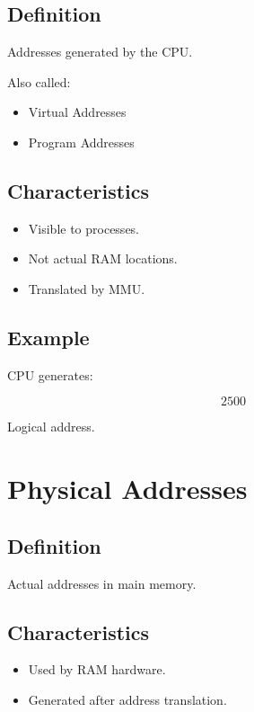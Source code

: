 \subsection{Definition}

Addresses generated by the CPU.

Also called:

\begin{itemize}
\item Virtual Addresses
\item Program Addresses
\end{itemize}

\subsection{Characteristics}

\begin{itemize}
\item Visible to processes.
\item Not actual RAM locations.
\item Translated by MMU.
\end{itemize}

\subsection{Example}

CPU generates:

\[
2500
\]

Logical address.

\section{Physical Addresses}

\subsection{Definition}

Actual addresses in main memory.

\subsection{Characteristics}

\begin{itemize}
\item Used by RAM hardware.
\item Generated after address translation.
\end{itemize}

